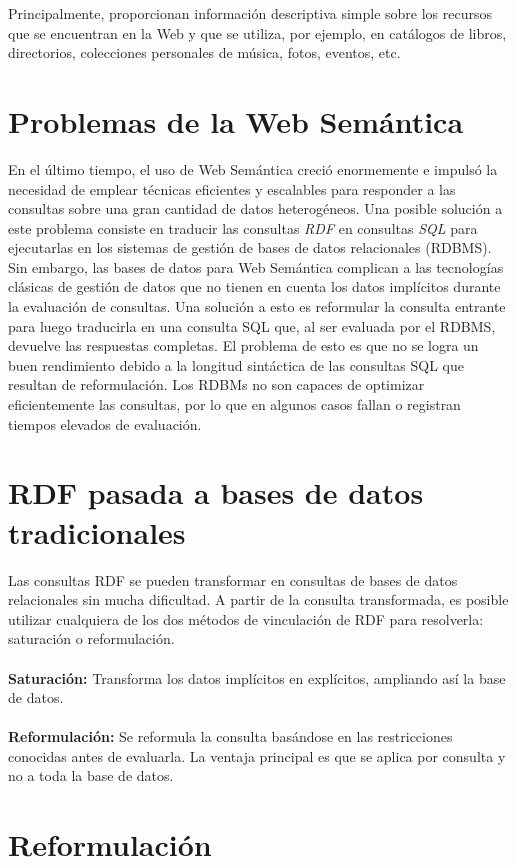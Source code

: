 \documentclass[10pt,a4paper]{article}
\begin{document}
Principalmente, proporcionan información descriptiva simple sobre los recursos que se encuentran en la Web y que se utiliza, por ejemplo, en catálogos de libros, directorios, colecciones personales de música, fotos, eventos, etc.

\section{Problemas de la Web Semántica}
En el último tiempo, el uso de Web Semántica creció enormemente e impulsó la necesidad de emplear técnicas eficientes y escalables para responder a las consultas sobre una gran cantidad de datos heterogéneos. Una posible solución a este problema consiste en traducir las consultas \textit{RDF} en consultas \textit{SQL} para ejecutarlas en los sistemas de gestión de bases de datos relacionales (RDBMS). Sin embargo, las bases de datos para Web Semántica complican a las tecnologías clásicas de gestión de datos que no tienen en cuenta los datos implícitos durante la evaluación de consultas. Una solución a esto es reformular la consulta entrante para luego traducirla en una consulta SQL que, al ser evaluada por el RDBMS, devuelve las respuestas completas. El problema de esto es que no se logra un buen rendimiento debido a la longitud sintáctica de las consultas SQL que resultan de reformulación. Los RDBMs no son capaces de optimizar eficientemente las consultas, por lo que en algunos casos fallan o registran tiempos elevados de evaluación.

\section{RDF pasada a bases de datos tradicionales}
Las consultas RDF se pueden transformar en consultas de bases de datos relacionales sin mucha dificultad. A partir de la consulta transformada, es posible utilizar cualquiera de los dos métodos de vinculación de RDF para resolverla: saturación o reformulación.
\\\\
\textbf{Saturación:} Transforma los datos implícitos en explícitos, ampliando así la base de datos. 
\\\\
\textbf{Reformulación:} Se reformula la consulta basándose en las restricciones conocidas antes de evaluarla. La ventaja principal es que se aplica por consulta y no a toda la base de datos.

\section{Reformulación}
\end{document}
